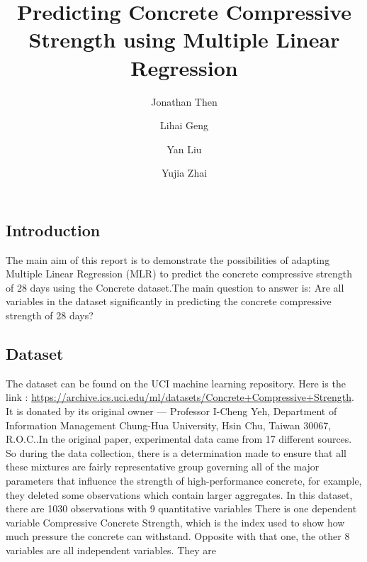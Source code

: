 \documentclass[letterpaper,9pt,twocolumn,twoside,]{pinp}
\title{Predicting Concrete Compressive Strength using Multiple Linear
Regression}
\author[]{Jonathan Then}
\author[]{Lihai Geng}
\author[]{Yan Liu}
\author[]{Yujia Zhai}
\affil[]{University of Sydney, Camperdown, New South Wales, Sydney, Australia,
2006}
\begin{document}
\verticaladjustment{-2pt}

\maketitle
\thispagestyle{firststyle}



\hypertarget{introduction}{%
\subsection{Introduction}\label{introduction}}

The main aim of this report is to demonstrate the possibilities of
adapting Multiple Linear Regression (MLR) to predict the concrete
compressive strength of 28 days using the Concrete dataset.The main
question to answer is: Are all variables in the dataset significantly in
predicting the concrete compressive strength of 28 days?

\hypertarget{dataset}{%
\subsection{Dataset}\label{dataset}}

The dataset can be found on the UCI machine learning repository. Here is
the link :
\url{https://archive.ics.uci.edu/ml/datasets/Concrete+Compressive+Strength}.
It is donated by its original owner --- Professor I-Cheng Yeh,
Department of Information Management Chung-Hua University, Hsin Chu,
Taiwan 30067, R.O.C..In the original paper, experimental data came from
17 different sources. So during the data collection, there is a
determination made to ensure that all these mixtures are fairly
representative group governing all of the major parameters that
influence the strength of high-performance concrete, for example, they
deleted some observations which contain larger aggregates. In this
dataset, there are 1030 observations with 9 quantitative variables There
is one dependent variable Compressive Concrete Strength, which is the
index used to show how much pressure the concrete can withstand.
Opposite with that one, the other 8 variables are all independent
variables. They are
\end{document}
